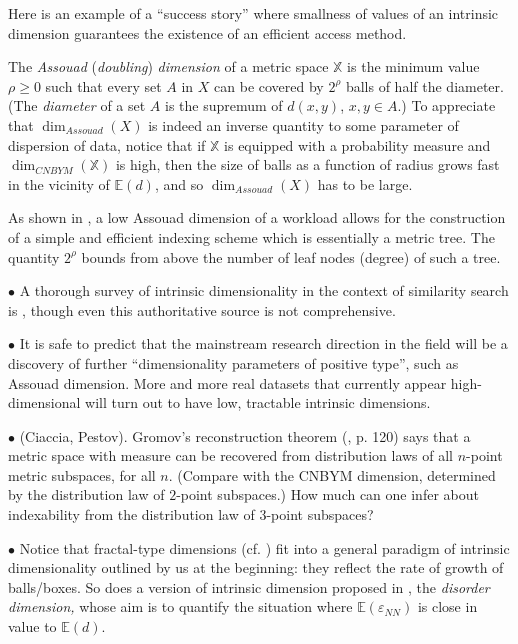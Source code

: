 \documentclass[12pt]{article}
\def\E{{\mathbb{E}}}
\def\e{\varepsilon}
\begin{document}
Here is an example of a ``success story'' where smallness of values of an intrinsic dimension guarantees the existence of an efficient access method. 

\smallskip
{}
The {\em Assouad} ({\em doubling}) {\em dimension} of a metric space $\mathbb X$ is the minimum value $\rho\geq 0$ such that every set $A$ in $X$ can be covered by $2^{\rho}$ balls of half the diameter. (The {\em diameter}  of a set $A$ is the supremum of $d(x,y)$, $x,y\in A$.) To appreciate that $\dim_{Assouad}(X)$ is indeed an inverse quantity to some parameter of dispersion of data, notice that if $\mathbb X$ is equipped with a probability measure and $\dim_{CNBYM}({\mathbb X})$ is high, then the size of balls as a function of radius grows fast in the vicinity of $\E(d)$, and so $\dim_{Assouad}(X)$ has to be large.

As shown in \cite{KL}, a low Assouad dimension of a workload allows for the construction of a simple and efficient indexing scheme which is essentially a metric tree. The quantity $2^{\rho}$ bounds from above the number of leaf nodes (degree) of such a tree.

\smallskip
{} $\bullet$
A thorough survey of intrinsic dimensionality in the context of similarity search is \cite{clarkson}, though even this authoritative source is not comprehensive. 

\noindent
$\bullet$ It is safe to predict that the mainstream research direction in the field will be a discovery of further ``dimensionality parameters of positive type'', such as Assouad dimension. More and more real datasets that currently appear high-dimensional will turn out to have low, tractable intrinsic dimensions.

\noindent
$\bullet$
(Ciaccia, Pestov). Gromov's reconstruction theorem (\cite{gromov:99}, p. 120) says that a metric space with measure can be recovered from distribution laws of all $n$-point metric subspaces, for all $n$. (Compare with the CNBYM dimension, determined by the distribution law of $2$-point subspaces.) How much can one infer about indexability from the distribution law of $3$-point subspaces?

\noindent
$\bullet$ Notice that fractal-type dimensions (cf. \cite{ttf}) fit into a general paradigm of intrinsic dimensionality outlined by us at the beginning: they reflect the rate of growth of balls/boxes. So does a version of intrinsic dimension  proposed in \cite{lifshits}, the {\em disorder dimension,} whose aim is to quantify the situation where $\E(\e_{NN})$ is close in value to $\E(d)$.
\end{document}
